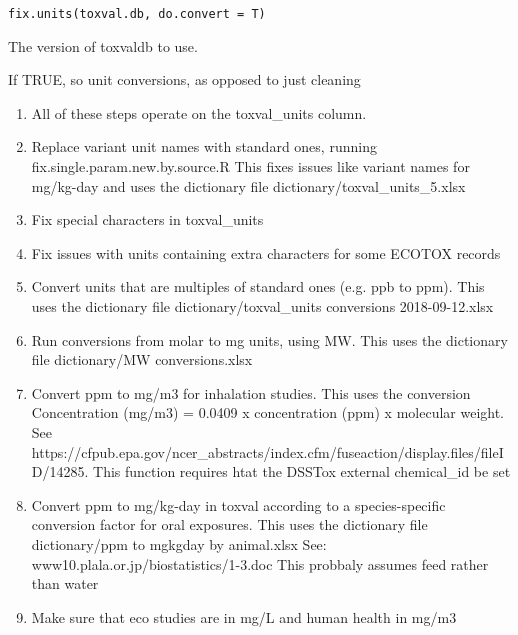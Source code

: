 \documentclass[letterpaper]{book}
\begin{document}
%
\begin{Usage}
\begin{verbatim}
fix.units(toxval.db, do.convert = T)
\end{verbatim}
\end{Usage}
%
\begin{Arguments}
\begin{ldescription}
\item[\code{toxval.db}] The version of toxvaldb to use.

\item[\code{do.convert}] If TRUE, so unit conversions, as opposed to just cleaning
\end{ldescription}
\end{Arguments}
%
\begin{Description}\relax
\begin{enumerate}

\item{} All of these steps operate on the toxval\_units column.
\item{} Replace variant unit names with standard ones, running fix.single.param.new.by.source.R
This fixes issues like variant names for mg/kg-day and uses the dictionary
file dictionary/toxval\_units\_5.xlsx
\item{} Fix special characters in toxval\_units
\item{} Fix issues with units containing extra characters for some ECOTOX records
\item{} Convert units that are multiples of standard ones (e.g. ppb to ppm). This
uses the dictionary file dictionary/toxval\_units conversions 2018-09-12.xlsx
\item{} Run conversions from molar to mg units, using MW. This uses the dictionary file
dictionary/MW conversions.xlsx
\item{} Convert ppm to mg/m3 for inhalation studies. This uses the conversion Concentration
(mg/m3) = 0.0409 x concentration (ppm) x molecular weight. See
https://cfpub.epa.gov/ncer\_abstracts/index.cfm/fuseaction/display.files/fileID/14285.
This function requires htat the DSSTox external chemical\_id be set
\item{} Convert ppm to mg/kg-day in toxval according to a species-specific
conversion factor for oral exposures. This uses the dictionary file
dictionary/ppm to mgkgday by animal.xlsx
See: www10.plala.or.jp/biostatistics/1-3.doc
This probbaly assumes feed rather than water
\item{} Make sure that eco studies are in mg/L and human health in mg/m3

\end{enumerate}

\end{Description}
\end{document}
